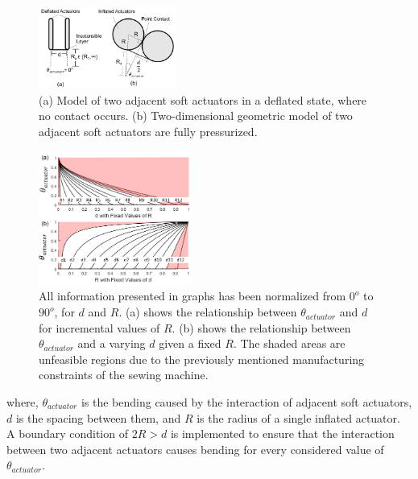 \documentclass[letterpaper, 10 pt, conference]{ieeeconf}  %
\begin{document}
\begin{figure}[t!]
\centering
\includegraphics[width=0.4\textwidth]{ActuatorModel1.PNG}
\caption{(a) Model of two adjacent soft actuators in a deflated state, where no contact occurs.  (b) Two-dimensional geometric model of two adjacent soft actuators are fully pressurized.}
\label{fig:Model1}
\vspace{-1.5em}
\end{figure}

\begin{figure}[b!]
\centering
\includegraphics[width=0.45\textwidth]{graphs_model1.PNG}
\caption{All information presented in graphs has been normalized from $0^o$ to $90^o$, for $d$ and $R$.  (a) shows the relationship between $\theta_{actuator}$ and $d$ for incremental values of $R$.  (b) shows the relationship between $\theta_{actuator}$ and a varying $d$ given a fixed $R$. The shaded areas are unfeasible regions due to the previously mentioned manufacturing constraints of the sewing machine.}
\label{fig:Graphs1}

\end{figure}	
where,  $\theta_{actuator}$ is the bending caused by the interaction of adjacent soft actuators,  $d$ is the spacing between them, and $R$ is the radius of a single inflated actuator. A boundary condition of $ 2R > d$ is implemented to ensure that the interaction between two adjacent actuators causes bending for every considered value of  $\theta_{actuator}$.   
\end{document}
